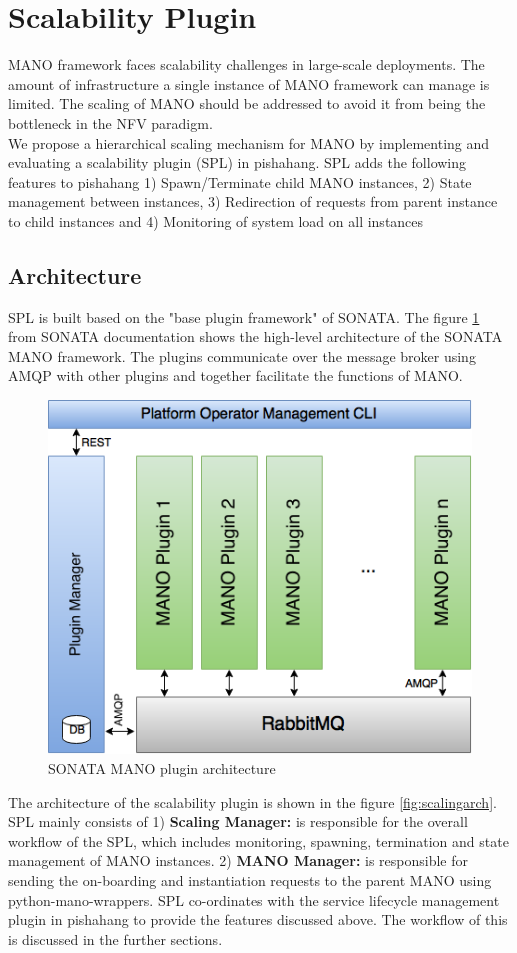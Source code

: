 \section{Scalability Plugin}

MANO framework faces scalability challenges in large-scale deployments. The amount of infrastructure a single instance of MANO framework can manage is limited. The scaling of MANO should be addressed to avoid it from being the bottleneck in the NFV paradigm. \\

We propose a hierarchical scaling mechanism for MANO by implementing and evaluating a scalability plugin (SPL) in pishahang. SPL adds the following features to pishahang 1) Spawn/Terminate child MANO instances, 2) State management between instances, 3) Redirection of requests from parent instance to child instances and 4) Monitoring of system load on all instances

\subsection{Architecture}

SPL is built based on the "base plugin framework" of SONATA. The figure \ref{fig:pmdesign} from SONATA documentation shows the high-level architecture of the SONATA MANO framework. The plugins communicate over the message broker using AMQP with other plugins and together facilitate the functions of MANO.

\begin{figure}[h]
	\centering
	\includegraphics[width=0.7\linewidth]{figures/pm_design}
	\caption{SONATA MANO plugin architecture}
	\label{fig:pmdesign}
\end{figure}

The architecture of the scalability plugin is shown in the figure \ref{fig:scalingarch}. SPL mainly consists of 1) \textbf{Scaling Manager:} is responsible for the overall workflow of the SPL, which includes monitoring, spawning, termination and state management of MANO instances. 2) \textbf{MANO Manager:} is responsible for sending the on-boarding and instantiation requests to the parent MANO using python-mano-wrappers. SPL co-ordinates with the service lifecycle management plugin in pishahang to provide the features discussed above. The workflow of this is discussed in the further sections. 

